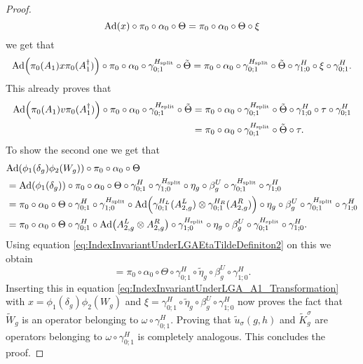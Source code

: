 \documentclass[11pt,a4paper,twoside]{article}
\numberwithin{equation}{section}
\begin{document}
\begin{proof}
	\begin{equation}
		\Ad{x}\circ\pi_0\circ\alpha_0\circ\Theta=\pi_0\circ\alpha_0\circ\Theta\circ\xi
	\end{equation}
	we get that
	\begin{equation}\label{eq:IndexInvariantUnderLGA_A1_Transformation}
		\Ad{\pi_0(A_1)x\pi_0(A_1^\dagger)}\circ\pi_0\circ\alpha_0\circ\gamma^{\Hsplit}_{0;1}\circ\tilde{\Theta}=\pi_0\circ\alpha_0\circ\gamma^{\Hsplit}_{0;1}\circ\tilde{\Theta}\circ\gamma^H_{1;0}\circ\xi\circ\gamma^H_{0;1}.
	\end{equation}
	This already proves that
	\begin{align}
		\Ad{\pi_0(A_1)v\pi_0(A_1^\dagger)}\circ\pi_0\circ\alpha_0\circ\gamma^{\Hsplit}_{0;1}\circ\tilde{\Theta}&=\pi_0\circ\alpha_0\circ\gamma^{\Hsplit}_{0;1}\circ\tilde{\Theta}\circ\gamma^H_{1;0}\circ\tau\circ\gamma^H_{0;1}\\
		&=\pi_0\circ\alpha_0\circ\gamma^{\Hsplit}_{0;1}\circ\tilde{\Theta}\circ\tau.
	\end{align}
	To show the second one we get that
	\begin{align}
		&\Ad{\phi_1(\delta_g)\phi_2(W_g)}\circ\pi_0\circ\alpha_0\circ\Theta\\
		&=\Ad{\phi_1(\delta_g)}\circ\pi_0\circ\alpha_0\circ\Theta\circ\gamma^{H}_{0;1}\circ\gamma^{\Hsplit}_{1;0}\circ\eta_g\circ\beta_g^U\circ\gamma^{\Hsplit}_{0;1}\circ\gamma^H_{1;0}\\
		&=\pi_0\circ\alpha_0\circ\Theta\circ\gamma^{H}_{0;1}\circ\gamma^{\Hsplit}_{1;0}\circ\Ad{\gamma^{H_L}_{0;1}(A_{2,g}^L)\otimes\gamma^{H_R}_{0;1}(A_{2,g}^R)}\circ\eta_g\circ\beta_g^U\circ\gamma^{\Hsplit}_{0;1}\circ\gamma^H_{1;0}\\
		&=\pi_0\circ\alpha_0\circ\Theta\circ\gamma^{H}_{0;1}\circ\Ad{A_{2,g}^L\otimes A_{2,g}^R}\circ\gamma^{\Hsplit}_{1;0}\circ\eta_g\circ\beta_g^U\circ\gamma^{\Hsplit}_{0;1}\circ\gamma^H_{1;0}.
	\end{align}
	Using equation \eqref{eq:IndexInvariantUnderLGAEtaTildeDefiniton2} on this we obtain
	\begin{equation}
		=\pi_0\circ\alpha_0\circ\Theta\circ\gamma^H_{0;1}\circ\tilde{\eta}_g\circ\beta_g^U\circ\gamma^H_{1;0}.
	\end{equation}
	Inserting this in equation \eqref{eq:IndexInvariantUnderLGA_A1_Transformation} with $x=\phi_1(\delta_g)\phi_2(W_g)$ and $\xi=\gamma^H_{0;1}\circ\tilde{\eta}_g\circ\beta_g^U\circ\gamma^H_{1;0}$ now proves the fact that $\tilde{W}_g$ is an operator belonging to $\omega\circ\gamma^H_{0;1}$. Proving that $\tilde u_\sigma(g,h)$ and $\tilde{K}_g^\sigma$ are operators belonging to $\omega\circ\gamma_{0;1}^H$ is completely analogous. This concludes the proof.
\end{proof}
\end{document}
